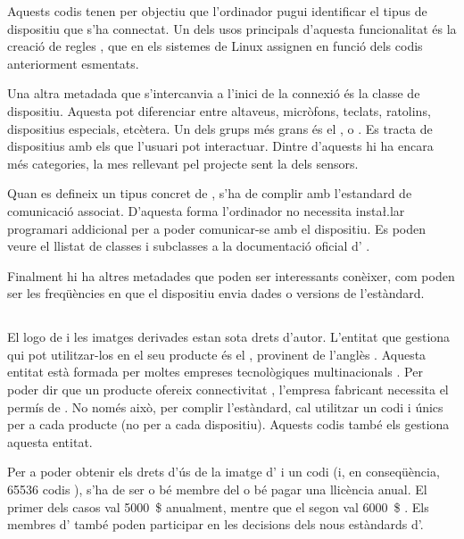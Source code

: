 Aquests codis tenen per objectiu que l'ordinador pugui identificar el tipus de
dispositiu que s'ha connectat. Un dels usos principals d'aquesta funcionalitat
és la creació de regles , que en els sistemes de Linux assignen
 en funció dels codis anteriorment esmentats.

Una altra metadada que s'intercanvia a l'inici de la connexió és la classe
de dispositiu. Aquesta pot diferenciar entre altaveus, micròfons, teclats,
ratolins, dispositius especials, etcètera. Un dels grups més grans és el
, o . Es tracta de dispositius amb els
que l'usuari pot interactuar. Dintre d'aquests hi ha encara més categories,
la mes rellevant pel projecte sent la dels sensors.

Quan es defineix un tipus concret de , s'ha de complir amb
l'estandard de comunicació associat. D'aquesta forma l'ordinador no necessita
insta\l.lar programari addicional per a poder comunicar-se amb el dispositiu.
Es poden veure el llistat de classes i subclasses  a la documentació
oficial d' \cite{HidDefinition}.

Finalment hi ha altres metadades que poden ser interessants conèixer, com
poden ser les freqüències en que el dispositiu envia dades o versions de
l'estàndard.

\subsection{}
\label{subsec:usb-if}

El logo de  i les imatges derivades estan sota drets d'autor. L'entitat
que gestiona qui pot utilitzar-los en el seu producte és el ,
provinent de l'anglès . Aquesta entitat està
formada per moltes empreses tecnològiques multinacionals \cite{USBGetting}.
Per poder dir que un producte ofereix connectivitat , l'empresa
fabricant necessita el permís de . No només això, per complir
l'estàndard, cal utilitzar un codi  i  únics per a cada
producte (no per a cada dispositiu). Aquests codis també els gestiona aquesta
entitat.

Per a poder obtenir els drets d'ús de la imatge d' i un codi
 (i, en conseqüència, \num[round-mode=places,round-precision=0]{65536}
codis ), s'ha de ser o bé
membre del  o bé pagar una llicència anual. El
primer dels casos val \SI[round-mode=places,round-precision=0]{5000}{\$}
anualment, mentre que el segon
val \SI[round-mode=places,round-precision=0]{6000}{\$}
\cite{USBGetting}. Els membres d' també poden participar en les
decisions dels nous estàndards d'.

